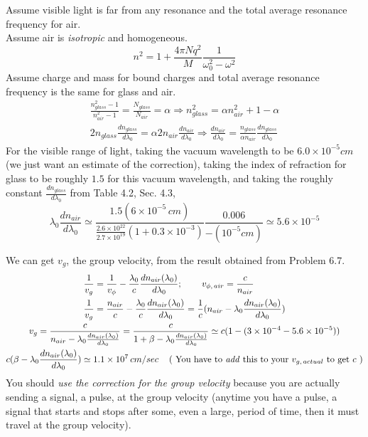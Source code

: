 \documentclass[twoside,10pt]{amsart}
\begin{document}
Assume visible light is far from any resonance and the total average resonance frequency for air.  \\
Assume air is \emph{isotropic} and homogeneous.  
\[
n^2 = 1 + \frac{4 \pi N q^2}{M} \frac{1}{ \omega_0^2 - \omega^2 }
\]
Assume charge and mass for bound charges and total average resonance frequency is the same for glass and air.  
\[
\begin{gathered}
  \frac{n_{glass}^2 - 1 }{ n_{air}^2 - 1 } = \frac{N_{glass}}{ N_{air}} = \alpha \Longrightarrow n^2_{glass} = \alpha n^2_{air} + 1 - \alpha \\
  2 n_{glass} \frac{dn_{glass}}{d \lambda_0} = \alpha 2 n_{air} \frac{dn_{air}}{d\lambda_0} \Longrightarrow \frac{dn_{air}}{d\lambda_0} = \frac{n_{glass}}{\alpha n_{air}} \frac{ dn_{glass}}{d\lambda_0} 
\end{gathered}
\]
For the visible range of light, taking the vacuum wavelength to be $6.0 \times 10^{-5} cm$ (we just want an estimate of the correction), taking the index of refraction for glass to be roughly $1.5$ for this vacuum wavelength, and taking the roughly constant $\frac{dn_{glass}}{d\lambda_0}$ from Table 4.2, Sec. 4.3, 
\[
\lambda_0 \frac{d n_{air}}{d\lambda_0} \simeq \frac{ 1.5 (6\times 10^{-5} \, cm ) }{ \frac{2.6 \times 10^{22}}{ 2.7 \times 10^{19}} (1 + 0.3 \times 10^{-3} ) } \frac{ 0.006}{-(10^{-5}cm) } \simeq 5.6 \times 10^{-5}
\]

We can get $v_{g}$, the group velocity, from the result obtained from Problem 6.7.
\[
\begin{gathered}
\begin{aligned}
  & \frac{1}{v_g} = \frac{1}{v_{\phi}} - \frac{\lambda_0}{c} \frac{dn_{air}(\lambda_0)}{ d \lambda_0 } ; \quad \quad \, v_{\phi, \, air } = \frac{c}{ n_{air} } \\
  & \frac{1}{v_g} = \frac{n_{air}}{c} - \frac{ \lambda_0}{c} \frac{ dn_{air}(\lambda_0)}{ d\lambda_0 } = \frac{1}{c} ( n_{air} - \lambda_0 \frac{d n_{air}(\lambda_0)}{d\lambda_0} ) 
\end{aligned} \\
v_g = \frac{c}{ n_{air} - \lambda_0 \frac{dn_{air}(\lambda_0)}{d\lambda_0} } = \frac{c}{ 1 + \beta - \lambda_0 \frac{dn_{air}(\lambda_0)}{d\lambda_0} } \simeq  c ( 1 - (3\times 10^{-4} - 5.6 \times 10^{-5} ) ) \\
  c ( \beta - \lambda_0 \frac{ dn_{air}(\lambda_0)}{d\lambda_0}) \simeq 1.1 \times 10^7 \, cm/sec \quad \, ( \text{ You have to \emph{add} this to your $v_{g, \, actual}$ to get $c$ } )
\end{gathered}
\]
You should \emph{use the correction for the group velocity} because you are actually sending a signal, a pulse, at the group velocity (anytime you have a pulse, a signal that starts and stops after some, even a large, period of time, then it must travel at the group velocity).  
\end{document}
